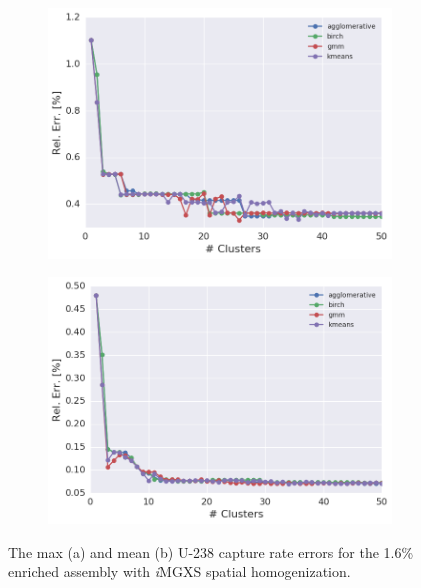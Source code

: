 \begin{figure}[h!]
\centering
\begin{subfigure}{0.9\textwidth}
  \centering
  \includegraphics[width=\linewidth]{figures/results/err-by-cluster/assm-16/max-rel-err}
  \caption{}
  \label{fig:chap11-max-capt-err-by-cluster-assm-16}
\end{subfigure}
\begin{subfigure}{0.9\textwidth}
  \centering
  \includegraphics[width=\linewidth]{figures/results/err-by-cluster/assm-16/mean-rel-err}
  \caption{}
  \label{fig:chap11-mean-capt-err-by-cluster-assm-16}
\end{subfigure}
\caption[U-238 capture error for the 1.6\% enriched assembly]{The max (a) and mean (b) U-238 capture rate errors for the 1.6\% enriched assembly with \textit{i}\ac{MGXS} spatial homogenization.}
\label{fig:chap11-capt-err-by-cluster-assm-16}
\end{figure}

